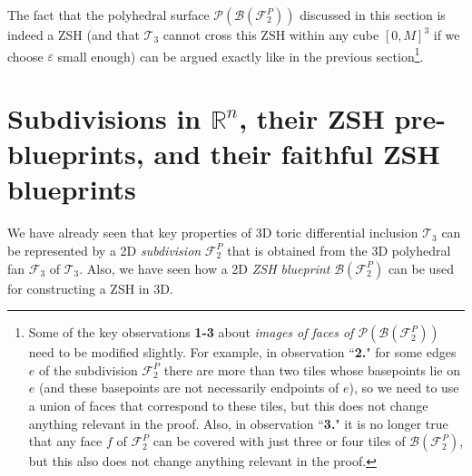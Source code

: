 \documentclass[12pt,letterpaper]{article}
\newcommand{\T}{\mathcal{T}}
\renewcommand{\P}{\mathcal{P}}
\newcommand{\B}{\mathcal{B}}
\newcommand{\F}{\mathcal{F}}
\newcommand{\RR}{\mathbb{R}}
\newcommand{\eps}{\varepsilon}
\begin{document}
The fact that the polyhedral surface $\P(\B(\mathcal{F}_2^P))$ discussed in this section is indeed a ZSH (and that $\T_3$ cannot cross this ZSH within any cube $[0,M]^3$ if we choose $\eps$ small enough) can be argued exactly like in the previous section\footnote{Some of the key observations {\bf 1-3} about {\em images of faces of $\P(\B(\mathcal{F}_2^P))$} need to be modified slightly. For example, in observation ``{\bf 2.}" for some edges $e$ of the subdivision $\F_2^P$ there are more than two tiles whose basepoints lie on $e$ (and these basepoints are not necessarily endpoints of $e$), so we need to use a union of faces that correspond to these tiles, but this  does not  change anything relevant in the proof. Also, in observation ``{\bf 3.}" it is no longer true that any face $f$ of  $\F_2^P$ can be covered with just three or four tiles of $\B(\F_2^P)$, but this also does not  change anything relevant in the proof.}.










\bigskip





















\bigskip

\newpage


















\section{Subdivisions  in $\RR^n$, their ZSH pre-blueprints, and their faithful ZSH blueprints}
\label{section_construction_of_ZSH_pre-bluprint_and blueprint_in_nD}


We have already seen that key properties of 3D toric differential inclusion $\T_3$ can be represented by a 2D  {\em subdivision} $\F_2^P$ that is obtained from the 3D polyhedral fan $\F_3$ of $\T_3$. Also, we have seen how a 2D  {\em ZSH blueprint} $\B(\F_2^P)$ can be used for constructing a ZSH in 3D.
\end{document}
